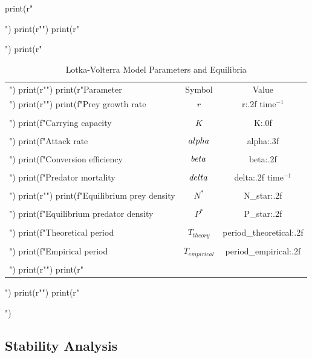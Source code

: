 \documentclass[a4paper, 11pt]{article}
\begin{document}
\begin{pycode}
print(r"\begin{table}[htbp]")
print(r"\centering")
print(r"\caption{Lotka-Volterra Model Parameters and Equilibria}")
print(r"\begin{tabular}{lcc}")
print(r"\toprule")
print(r"Parameter & Symbol & Value \\")
print(r"\midrule")
print(f"Prey growth rate & $r$ & {r:.2f} time$^{{-1}}$ \\\\")
print(f"Carrying capacity & $K$ & {K:.0f} \\\\")
print(f"Attack rate & $\\alpha$ & {alpha:.3f} \\\\")
print(f"Conversion efficiency & $\\beta$ & {beta:.2f} \\\\")
print(f"Predator mortality & $\\delta$ & {delta:.2f} time$^{{-1}}$ \\\\")
print(r"\midrule")
print(f"Equilibrium prey density & $N^*$ & {N_star:.2f} \\\\")
print(f"Equilibrium predator density & $P^*$ & {P_star:.2f} \\\\")
print(f"Theoretical period & $T_{{theory}}$ & {period_theoretical:.2f} \\\\")
print(f"Empirical period & $T_{{empirical}}$ & {period_empirical:.2f} \\\\")
print(r"\bottomrule")
print(r"\end{tabular}")
print(r"\label{tab:dynamics}")
print(r"\end{table}")
\end{pycode}

\subsection{Stability Analysis}
\end{document}
